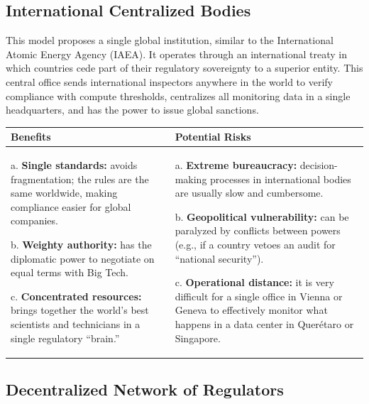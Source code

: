 \subsection*{International Centralized Bodies}

This model proposes a single global institution, similar to the International Atomic Energy Agency (IAEA). It operates through an international treaty in which countries cede part of their regulatory sovereignty to a superior entity. This central office sends international inspectors anywhere in the world to verify compliance with compute thresholds, centralizes all monitoring data in a single headquarters, and has the power to issue global sanctions.


\begin{center}
\begin{tabular}{|p{5cm}|p{5cm}|}
\hline
\textbf{Benefits} & \textbf{Potential Risks} \\
\hline
a. \textbf{Single standards:} avoids fragmentation; the rules are the same worldwide, making compliance easier for global companies.

\vspace{0.2cm}
b. \textbf{Weighty authority:} has the diplomatic power to negotiate on equal terms with Big Tech.

\vspace{0.2cm}
c. \textbf{Concentrated resources:} brings together the world's best scientists and technicians in a single regulatory ``brain.'' 
& 
a. \textbf{Extreme bureaucracy:} decision-making processes in international bodies are usually slow and cumbersome.

\vspace{0.2cm}
b. \textbf{Geopolitical vulnerability:} can be paralyzed by conflicts between powers (e.g., if a country vetoes an audit for ``national security'').

\vspace{0.2cm}
c. \textbf{Operational distance:} it is very difficult for a single office in Vienna or Geneva to effectively monitor what happens in a data center in Querétaro or Singapore. \\
\hline
\end{tabular}
\end{center}

\subsection*{Decentralized Network of Regulators}

